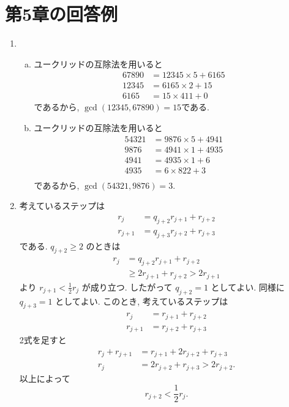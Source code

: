 \section{第5章の回答例} %
\begin{enumerate}[5.1] %
\item
\begin{enumerate}[(a)] %
  \item ユークリッドの互除法を用いると
    \begin{align*}
      67890 &= 12345 \times 5 + 6165 \\
      12345 &= 6165 \times 2 + 15 \\
      6165  &= 15 \times 411 + 0
    \end{align*}
    であるから, $\gcd(12345, 67890) = 15$である.
  \item ユークリッドの互除法を用いると
    \begin{align*}
      54321 &= 9876 \times 5   + 4941 \\
      9876  &= 4941 \times 1   + 4935 \\
      4941  &= 4935 \times 1   + 6    \\
      4935  &= 6    \times 822 + 3    \\
    \end{align*}
    であるから, $\gcd(54321, 9876) = 3$.
\end{enumerate} %
\item %
考えているステップは
\begin{align*}
  r_j     &= q_{j+2}r_{j+1} + r_{j+2} \\
  r_{j+1} &= q_{j+3}r_{j+2} + r_{j+3}
\end{align*}
である.
$q_{j+2} \ge 2$ のときは
\begin{align*}
  r_j
    &= q_{j+2}r_{j+1} + r_{j+2} \\
    &\ge 2r_{j+1} + r_{j+2} > 2r_{j+1}
\end{align*}
より $r_{j+1} < \frac{1}{2} r_j$ が成り立つ.
したがって $q_{j+2} = 1$ としてよい.
同様に$q_{j+3} = 1$ としてよい.
このとき, 考えているステップは
\begin{align*}
  r_j &= r_{j+1} + r_{j+2} \\
  r_{j+1} &= r_{j+2} + r_{j+3}
\end{align*}
2式を足すと
\begin{align*}
  r_{j} + r_{j+1} &= r_{j+1} + 2r_{j+2} + r_{j+3} \\
  r_j &= 2r_{j+2} + r_{j+3} > 2r_{j+2}.
\end{align*}
以上によって
\[
  r_{j+2} < \frac{1}{2} r_j.
\]


\end{enumerate}
